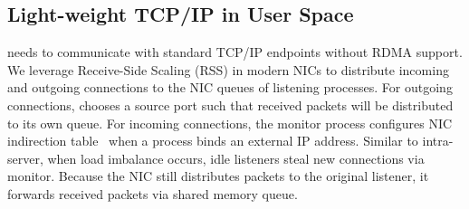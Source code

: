 

\subsection{Light-weight TCP/IP in User Space}
\label{subsec:lwip}

\sys{} needs to communicate with standard TCP/IP endpoints without RDMA support. We leverage Receive-Side Scaling (RSS) in modern NICs to distribute incoming and outgoing connections to the NIC queues of listening processes. For outgoing connections, \libipc{} chooses a source port such that received packets will be distributed to its own queue. For incoming connections, the monitor process configures NIC indirection table~\cite{mellanox} when a process binds an external IP address. Similar to intra-server, when load imbalance occurs, idle listeners steal new connections via monitor. Because the NIC still distributes packets to the original listener, it forwards received packets via shared memory queue.




